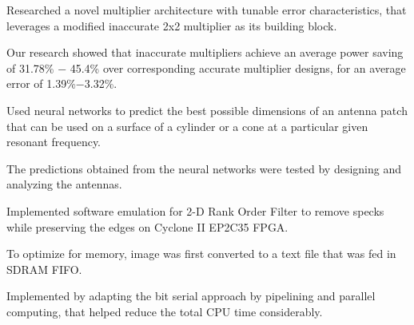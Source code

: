 \documentclass[letterpaper]{deedy-resume} %
\begin{document}
\begin{minipage}[t]{0.76\textwidth}
\begin{tightitemize}
\item Researched a novel multiplier architecture with tunable error characteristics, that leverages a modified inaccurate 2x2 multiplier as its building block.
\item Our research showed that inaccurate multipliers achieve an average power saving of 31.78\% − 45.4\% over corresponding accurate multiplier designs, for an average error of 1.39\%−3.32\%.
\end{tightitemize}
\sectionspace %
\begin{tightitemize}
\item Used neural networks to predict the best possible dimensions of an antenna patch that can be used on a surface of a cylinder or a cone at a particular given resonant frequency. 
\item The predictions obtained from the neural networks were tested by designing and analyzing the antennas.
\end{tightitemize}

\sectionspace %


\sectionspace %

\begin{tightitemize}
\item Implemented software emulation for 2-D Rank Order Filter to remove specks while preserving the edges on Cyclone II EP2C35 FPGA.
\item To optimize for memory, image was first converted to a text file that was fed in SDRAM FIFO.
\item Implemented by adapting the bit serial approach by pipelining and parallel computing, that helped reduce the total CPU time considerably.
\end{tightitemize}


\end{minipage}
\end{document}

